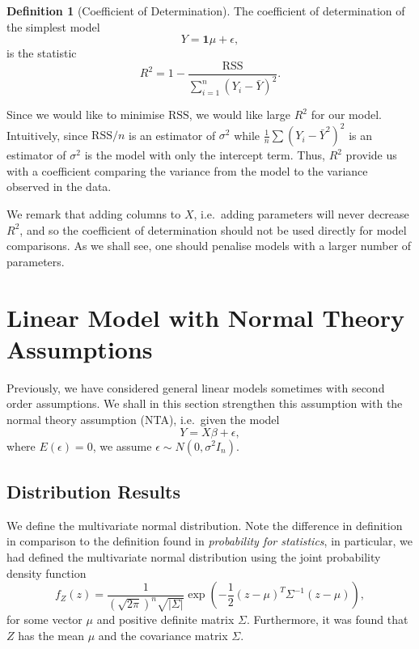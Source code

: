 \documentclass[
]{article}
\theoremstyle{definition}
\theoremstyle{definition}
\newtheorem{definition}{Definition}[section]
\begin{document}
\begin{definition}[Coefficient of Determination]
  The coefficient of determination of the simplest model 
  \[Y = \mathbf{1}\mu + \epsilon,\]
  is the statistic 
  \[R^2 = 1 - \frac{\text{RSS}}{\sum_{i = 1}^n (Y_i - \bar Y)^2}.\]
\end{definition}

Since we would like to minimise \(\text{RSS}\), we would like large
\(R^2\) for our model. Intuitively, since \(\text{RSS} / n\) is an
estimator of \(\sigma^2\) while \(\frac{1}{n}\sum(Y_i - \bar Y^2)^2\) is
an estimator of \(\sigma^2\) is the model with only the intercept term.
Thus, \(R^2\) provide us with a coefficient comparing the variance from
the model to the variance observed in the data.

We remark that adding columns to \(X\), i.e.~adding parameters will
never decrease \(R^2\), and so the coefficient of determination should
not be used directly for model comparisons. As we shall see, one should
penalise models with a larger number of parameters.

\newpage

\hypertarget{linear-model-with-normal-theory-assumptions}{%
\section{Linear Model with Normal Theory
Assumptions}\label{linear-model-with-normal-theory-assumptions}}

Previously, we have considered general linear models sometimes with
second order assumptions. We shall in this section strengthen this
assumption with the normal theory assumption (NTA), i.e.~given the model
\[Y = X \beta + \epsilon,\] where \(E(\epsilon) = 0\), we assume
\(\epsilon \sim N(0, \sigma^2 I_n)\).

\hypertarget{distribution-results}{%
\subsection{Distribution Results}\label{distribution-results}}

We define the multivariate normal distribution. Note the difference in
definition in comparison to the definition found in \emph{probability
for statistics}, in particular, we had defined the multivariate normal
distribution using the joint probability density function
\[f_Z(z) = \frac{1}{(\sqrt{2\pi})^n \sqrt{|\Sigma|}} \exp\left(-\frac{1}{2} 
  (z - \mu)^T \Sigma^{-1}(z - \mu)\right),\] for some vector \(\mu\) and
positive definite matrix \(\Sigma\). Furthermore, it was found that
\(Z\) has the mean \(\mu\) and the covariance matrix \(\Sigma\).
\end{document}
